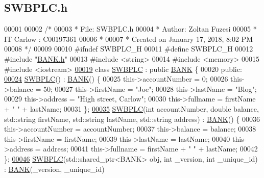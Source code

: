 \hypertarget{_s_w_b_p_l_c_8h_source}{}\subsection{S\+W\+B\+P\+L\+C.\+h}

\begin{DoxyCode}
00001 
00002 \textcolor{comment}{/* }
00003 \textcolor{comment}{ * File:   SWBPLC.h}
00004 \textcolor{comment}{ * Author: Zoltan Fuzesi}
00005 \textcolor{comment}{ * IT Carlow : C00197361}
00006 \textcolor{comment}{ *}
00007 \textcolor{comment}{ * Created on January 17, 2018, 8:02 PM}
00008 \textcolor{comment}{ */}
00009 
00010 \textcolor{preprocessor}{#ifndef SWBPLC\_H}
00011 \textcolor{preprocessor}{#define SWBPLC\_H}
00012 \textcolor{preprocessor}{#include "\hyperlink{_b_a_n_k_8h}{BANK.h}"}
00013 \textcolor{preprocessor}{#include <string>}
00014 \textcolor{preprocessor}{#include <memory>}
00015 \textcolor{preprocessor}{#include <iostream>}
\hypertarget{_s_w_b_p_l_c_8h_source.tex_l00019}{}\hyperlink{class_s_w_b_p_l_c}{00019} \textcolor{keyword}{class }\hyperlink{class_s_w_b_p_l_c}{SWBPLC} : \textcolor{keyword}{public} \hyperlink{class_b_a_n_k}{BANK} \{
00020 \textcolor{keyword}{public}:
\hypertarget{_s_w_b_p_l_c_8h_source.tex_l00024}{}\hyperlink{class_s_w_b_p_l_c_a320f4e2b023038668d941ce5d0c46aeb}{00024}     \hyperlink{class_s_w_b_p_l_c_a320f4e2b023038668d941ce5d0c46aeb}{SWBPLC}() : \hyperlink{class_b_a_n_k}{BANK}() \{
00025         this->accountNumber = 0;
00026         this->balance = 50;
00027         this->firstName = \textcolor{stringliteral}{"Joe"};
00028         this->lastName = \textcolor{stringliteral}{"Blog"};
00029         this->address = \textcolor{stringliteral}{"High street, Carlow"};
00030         this->fullname = firstName + \textcolor{stringliteral}{" "} + lastName;
00031     \};
\hypertarget{_s_w_b_p_l_c_8h_source.tex_l00035}{}\hyperlink{class_s_w_b_p_l_c_a29c408f7ccb7c5962dab8ac858758a89}{00035}     \hyperlink{class_s_w_b_p_l_c_a29c408f7ccb7c5962dab8ac858758a89}{SWBPLC}(\textcolor{keywordtype}{int} accountNumber, \textcolor{keywordtype}{double} balance, std::string firstName, std::string lastName, 
      std::string address) : \hyperlink{class_b_a_n_k}{BANK}() \{
00036         this->accountNumber = accountNumber;
00037         this->balance = balance;
00038         this->firstName = firstName;
00039         this->lastName = lastName;
00040         this->address = address;
00041         this->fullname = firstName + \textcolor{stringliteral}{" "} + lastName;
00042     \};
\hypertarget{_s_w_b_p_l_c_8h_source.tex_l00046}{}\hyperlink{class_s_w_b_p_l_c_a33e460bff6f51b30209a6f5a25a24d7d}{00046}     \hyperlink{class_s_w_b_p_l_c_a33e460bff6f51b30209a6f5a25a24d7d}{SWBPLC}(std::shared\_ptr<BANK> obj, \textcolor{keywordtype}{int} \_version, \textcolor{keywordtype}{int} \_unique\_id) : \hyperlink{class_b_a_n_k}{BANK}(\_version, \_unique\_id) 

\end{DoxyCode}
